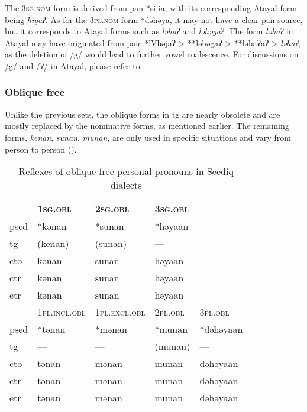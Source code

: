 The \textsc{3sg.nom} form is derived from \acs{pan} *si ia, with its corresponding Atayal form being \textit{hiyaʔ}. As for the \textsc{3pl.nom} form *dəhəya, it may not have a clear \acs{pan} source, but it corresponds to Atayal forms such as \textit{ləhaʔ} and \textit{ləhəgaʔ}. The form \textit{ləhaʔ} in Atayal may have originated from \acl{paic} *lVhəjaʔ > **ləhəgaʔ > **ləhaʔaʔ > \textit{ləhaʔ}, as the deletion of /g/ would lead to further vowel coalescence. For discussions on /g/ and /ʔ/ in Atayal, please refer to \textcite{goderich2020phd,song2023Aicgprime}. 

\subsubsection{Oblique free}

Unlike the previous sets, the oblique forms in \acl{tg} are nearly obsolete and are mostly replaced by the nominative forms, as mentioned earlier. The remaining forms, \textit{kenan}, \textit{sunan}, \textit{munan}, are only used in specific situations and vary from person to person (\cite{Sung2018Sedgrammar}).

\begin{table}[!htbp]
\centering
\caption{Reflexes of oblique free personal pronouns in Seediq dialects}
\label{tab:oblfree}
\begin{tabular}{lllll}
\hline
      & \textsc{1sg.obl}      & \textsc{2sg.obl}      & \textsc{3sg.obl} &           \\ \hline
\acs{psed} & *kənan       & *sunan       & *həyaan &           \\
\acs{tg}  & (kenan)      & (sunan)      & ---     &           \\
\acs{cto}  & kənan        & sunan        & həyaan  &           \\
\acs{ctr} & kənan        & sunan        & həyaan  &           \\
\acs{etr} & kənan        & sunan        & həyaan  &           \\ \hline
      & \textsc{1pl.incl.obl} & \textsc{1pl.excl.obl} & \textsc{2pl.obl} & \textsc{3pl.obl}   \\ \hline
\acs{psed} & *tənan       & *mənan       & *munan  & *dəhəyaan \\
\acs{tg}  & ---          & ---          & (munan) & ---       \\
\acs{cto}  & tənan        & mənan        & munan   & dəhəyaan  \\
\acs{ctr} & tənan        & mənan        & munan   & dəhəyaan  \\
\acs{etr} & tənan        & mənan        & munan   & dəhəyaan  \\ \hline
\end{tabular}
\end{table}

